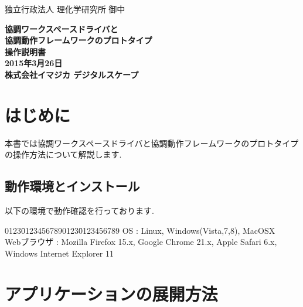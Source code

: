 \documentclass[a4paper,10pt,oneside]{jsbook}
\begin{document}
\begin{titlepage}
\noindent
独立行政法人 理化学研究所 御中
\begin{center}
	\vspace{8cm}
	{\Huge \textbf{協調ワークスペースドライバと}} \\
	\vspace{1cm}
	{\Huge \textbf{協調動作フレームワークのプロトタイプ}} \\
	\vspace{1cm}
	{\Huge \textbf{操作説明書}} \\
	\vspace{10cm}
	{\Large \textbf{2015年3月26日}} \\
	\vspace{0.5cm}
	{\Large \textbf{株式会社イマジカ デジタルスケープ}}
\end{center}
\end{titlepage}



\tableofcontents

\chapter{はじめに}
本書では協調ワークスペースドライバと協調動作フレームワークのプロトタイプの操作方法について解説します.\\

\section{動作環境とインストール}
以下の環境で動作確認を行っております.\\

\begin{tabbing}
0123\=01234567890123\=0123456789\kill
\> OS \> : Linux, Windows(Vista,7,8), MacOSX \\
\> Webブラウザ \> : Mozilla Firefox 15.x, Google Chrome 21.x, Apple Safari 6.x, Windows Internet Explorer 11 
\end{tabbing}

\newpage

\chapter{アプリケーションの展開方法}
\end{document}
